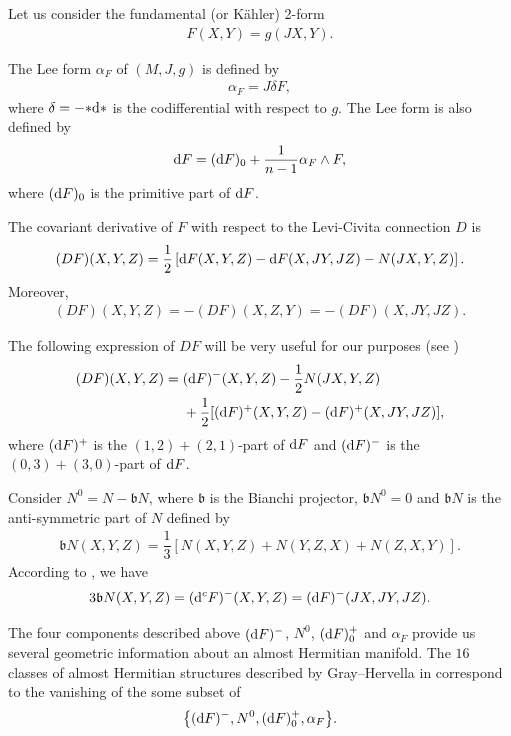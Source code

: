 \documentclass[10pt,a4paper]{amsart}
\numberwithin{equation}{section}
\begin{document}
Let us consider the fundamental (or K\"ahler) 2-form
\begin{gather*}
F(X,Y)=g(JX,Y).
\end{gather*}

The Lee form $\alpha_{F}$ of $(M,J,g)$ is defined by
\begin{gather*}
\alpha_{F}=J\delta F,
\end{gather*}
where $\delta=-{*{\rm d}*}$ is the codifferential with respect to $g$. The Lee form is also defined by
\begin{gather*}
{\rm d}F=({\rm d}F)_{0}+\dfrac{1}{n-1}\alpha_{F}\wedge F,
\end{gather*}
where $({\rm d}F)_{0}$ is the primitive part of ${\rm d}F$.

The covariant derivative of $F$ with respect to the Levi-Civita connection $D$ is
\begin{gather*}
(DF)(X,Y,Z)=\dfrac{1}{2}\left[{\rm d}F(X,Y,Z)-{\rm d}F(X,JY,JZ)-N(JX,Y,Z)\right].
\end{gather*}
Moreover,
\begin{gather*}
(DF)(X,Y,Z)=-(DF)(X,Z,Y)=-(DF)(X,JY,JZ).
\end{gather*}

{\samepage
The following expression of $DF$ will be very useful for our purposes (see \cite{fu,gau})
\begin{align*}
(DF)(X,Y,Z)={}&({\rm d}F)^{-}(X,Y,Z)-\dfrac{1}{2}N(JX,Y,Z)
\\
&+\dfrac{1}{2}[({\rm d}F)^{+}(X,Y,Z)-({\rm d}F)^{+}(X,JY,JZ)],
\end{align*}
where
$({\rm d}F)^{+}$ is the $(1,2)+(2,1)$-part of ${\rm d}F$ and $({\rm d}F)^{-}$ is the $(0,3)+(3,0)$-part of ${\rm d}F$.

}

Consider $N^{0}=N-\mathfrak{b}N$, where $\mathfrak{b}$ is the Bianchi projector, $\mathfrak{b}N^{0}=0$ and $\mathfrak{b}N$ is the anti-symmetric part of $N$ defined by
\begin{gather*}
\mathfrak{b}N(X,Y,Z)=\dfrac{1}{3}[N(X,Y,Z)+N(Y,Z,X)+N(Z,X,Y)].
\end{gather*}
According to \cite{gau}, we have
\begin{gather*}
3\mathfrak{b}N(X,Y,Z)=({\rm d}^{c}F)^{-}(X,Y,Z)=({\rm d}F)^{-}(JX,JY,JZ).
\end{gather*}

The four components described above $({\rm d}F)^{-}$, $N^{0}$, $({\rm d}F)^{+}_{0}$ and $\alpha_{F}$ provide us several geometric information about an almost Hermitian manifold. The $16$ classes of almost Hermitian structures described by Gray--Hervella in \cite{sub} correspond to the vanishing of the some subset of
\begin{gather*}
\big\{({\rm d}F)^{-}, N^{0}, ({\rm d}F)^{+}_{0},\alpha_{F}\big\}.
\end{gather*}
\end{document}
